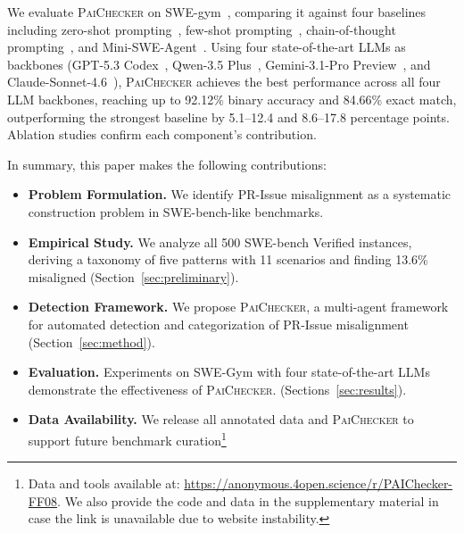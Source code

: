 \documentclass[sigconf, review, anonymous]{acmart}
\newcommand{\tool}{\textsc{PaiChecker}\xspace}
\begin{document}
    We evaluate \tool on SWE-gym~\cite{swegym},
    comparing it against four baselines including zero-shot prompting~\cite{zeroshot_fewshot}, few-shot prompting~\cite{zeroshot_fewshot},
    chain-of-thought prompting~\cite{cot}, and Mini-SWE-Agent~\cite{minisweagent}. Using
    four state-of-the-art LLMs as backbones (GPT-5.3 Codex~\cite{gpt53codex}, Qwen-3.5 Plus~\cite{qwen35},
    Gemini-3.1-Pro Preview~\cite{gemini31pro}, and Claude-Sonnet-4.6~\cite{claudesonnet46}), \tool achieves the best 
  performance across all four LLM backbones, reaching up to 92.12\% binary     
  accuracy and 84.66\% exact match, outperforming the strongest baseline by      
  5.1--12.4 and 8.6--17.8 percentage points. Ablation studies confirm each component's                          
  contribution.

    In summary, this paper makes the following contributions:
\begin{itemize}[leftmargin=*]
      \item \textbf{Problem Formulation.} We identify PR-Issue                          
          misalignment as a systematic construction problem in                       
          SWE-bench-like \nolinebreak bench\nolinebreak marks.
                                                                                           
      \item \textbf{Empirical Study.} We analyze all 500 SWE-bench                       
          Verified instances, deriving a taxonomy of five patterns with                    
          11 scenarios and finding 13.6\% misaligned                                       
          (Section~\ref{sec:preliminary}).                                                 
   
      \item \textbf{Detection Framework.} We propose \tool, a                              
          multi-agent framework for automated detection and                              
          categorization of PR-Issue misalignment
          (Section~\ref{sec:method}).
                                                                                           
      \item \textbf{Evaluation.} Experiments on SWE-Gym with four
          state-of-the-art LLMs demonstrate the effectiveness of \tool.
          (Sec\nolinebreak tions~\ref{sec:results}).
                                                                                           
      \item \textbf{Data Availability.} We release all annotated data                     
          and \tool to support future benchmark
          curation\footnote{Data and tools available at:                                   
          \url{https://anonymous.4open.science/r/PAIChecker-FF08}. We also provide the code and data in the supplementary material in case the link is unavailable due to website instability.}                       
  \end{itemize}
\end{document}
